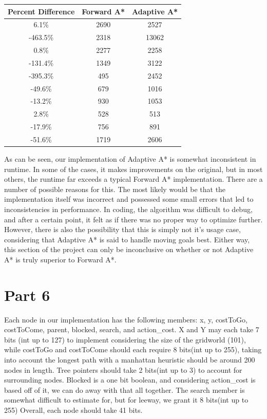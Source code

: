 \documentclass{article}
\begin{document}
\begin{center}
	\begin{tabular}{|c|c|c|}
		\hline
		Percent Difference & Forward A* & Adaptive A* \\
		\hline
		6.1\% & 2690 & 2527 \\
		-463.5\% & 2318 & 13062 \\
		0.8\% & 2277 & 2258 \\
		-131.4\% & 1349 & 3122 \\
		-395.3\% & 495 & 2452 \\
		-49.6\% & 679 & 1016 \\
		-13.2\% & 930 & 1053 \\
		2.8\% & 528 & 513 \\
		-17.9\% & 756 & 891 \\
		-51.6\% & 1719 & 2606 \\
		\hline
	\end{tabular}
\end{center}
As can be seen, our implementation of Adaptive A* is somewhat inconsistent in runtime. In some of the cases, it makes improvements on the original, but in most others, the runtime far exceeds a typical Forward A* implementation. There are a number of possible reasons for this. The most likely would be that the implementation itself was incorrect and possessed some small errors that led to inconsistencies in performance. In coding, the algorithm was difficult to debug, and after a certain point, it felt as if there was no proper way to optimize further. However, there is also the possibility that this is simply not it's usage case, considering that Adaptive A* is said to handle moving goals best. Either way, this section of the project can only be inconclusive on whether or not Adaptive A* is truly superior to Forward A*.

\section{Part 6}
Each node in our implementation has the following members: x, y, costToGo, costToCome, parent, blocked, search, and action\_cost. X and Y may each take 7 bits (int up to 127) to implement considering the size of the gridworld (101), while costToGo and costToCome should each require 8 bits(int up to 255), taking into account the longest path with a manhattan heuristic should be around 200 nodes in length. Tree pointers should take 2 bits(int up to 3) to account for surrounding nodes. Blocked is a one bit boolean, and considering action\_cost is based off of it, we can do away with that all together. The search member is somewhat difficult to estimate for, but for leeway, we grant it 8 bits(int up to 255) Overall, each node should take 41 bits.
\end{document}
